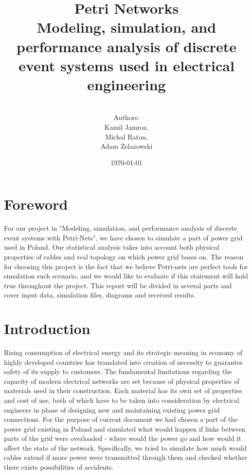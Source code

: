\documentclass[a4paper]{article}
\title{Petri Networks\\Modeling, simulation, and performance analysis of discrete event systems used in electrical engineering}
\author{\\Authors:\\ Kamil Jamroz,\\ Michal Raton,\\ Adam Zelazowski\\}
\date{\today}
\begin{document}
\nocite{*}

\maketitle

\clearpage

\tableofcontents

\clearpage

%
\section{Foreword}
\label{cha:foreword}
\paragraph{}

For our project in "Modeling, simulation, and performance analysis of discrete event systems with Petri-Nets", we have chosen to simulate a part of power grid used in Poland. Our statistical analysis takes into account both physical properties of cables and real topology on which power grid bases on. The reason for choosing this project is the fact that we believe Petri-nets are perfect tools for simulation such scenario, and we would like to evaluate if this statement will hold true throughout the project. This report will be divided in several parts and cover input data, simulation files, diagrams and received results.

%
\section{Introduction}  
\label{cha:introduction}
\paragraph{}

Rising consumption of electrical energy and its strategic meaning in economy of highly developed countries has translated into creation of necessity to guarantee safety of its supply to customers. The fundamental limitations regarding the capacity of modern electrical networks are set because of physical properties of materials used in their construction. Each material has its own set of properties and cost of use, both of which have to be taken into consideration by electrical engineers in phase of designing new and maintaining existing power grid connections. For the purpose of current document we had chosen a part of the power grid existing in Poland and simulated what would happen if links between parts of the grid were overloaded - where would the power go and how would it affect the state of the network. Specifically, we tried to simulate how much would cables extend if more power were transmitted through them and checked whether there exists possibilities of accidents.
\end{document}
